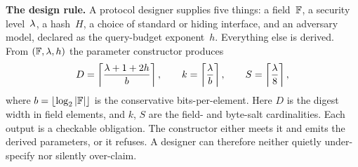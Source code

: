 
\begin{rulebox}
\noindent\textbf{The design rule.}\quad
A protocol designer supplies five things: a field~$\mathbb{F}$, a security
level~$\lambda$, a hash~$H$, a choice of standard or hiding interface, and an
adversary model, declared as the query-budget exponent~$h$.  Everything else
is derived.  From $(\mathbb{F},\lambda,h)$ the parameter constructor produces
\begin{equation}\label{eq:rule}
  D=\left\lceil\frac{\lambda+1+2h}{b}\right\rceil,\qquad
  k=\left\lceil\frac{\lambda}{b}\right\rceil,\qquad
  S=\left\lceil\frac{\lambda}{8}\right\rceil,
\end{equation}
where $b=\lfloor\log_2|\mathbb{F}|\rfloor$ is the conservative bits-per-element.
Here $D$ is the digest width in field elements, and $k$, $S$ are the field-
and byte-salt cardinalities.  Each output is a checkable obligation.  The
constructor either meets it and emits the derived parameters, or it refuses.
A designer can therefore neither quietly under-specify nor silently
over-claim.
\end{rulebox}
